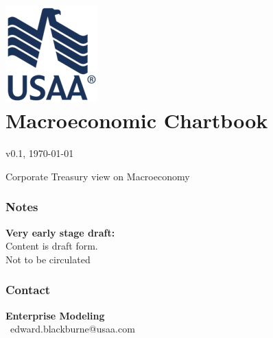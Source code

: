 \documentclass{report}
\begin{document}
\chapter*{
		\includegraphics{blue_eagle.png}\\ \color{usaablue} Macroeconomic Chartbook}
\vspace*{-16mm}

\footnotesize \hspace{11mm} \color{usaablue}v0.1, \today \normalsize 

\vspace{11mm}

\normalsize \color{usaablue}Corporate Treasury view on Macroeconomy

\vspace{16mm}

\thispagestyle{empty}

\begin{minipage}{0.36\textwidth}
\subsection*{ {\color{red} \faExclamationTriangle} \seriffont Notes}

{\color{red} \textbf{Very early stage draft:}} \\
Content is draft form. \\ Not to be circulated 
\vfill

\end{minipage}
\begin{minipage}{0.36\textwidth}
\subsection*{{\color{gray} \faUser} Contact}

\textbf{Enterprise Modeling} \  \\
{\color{gray} \faEnvelope} \ edward.blackburne@usaa.com \ \\

\end{minipage}
\end{document}

